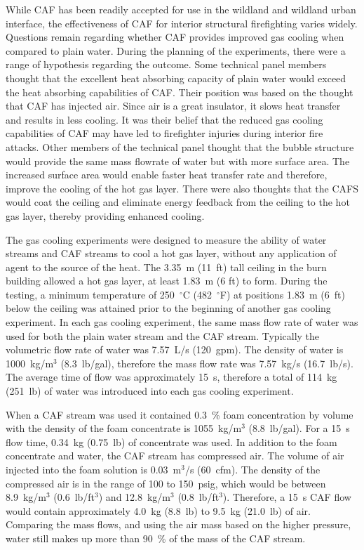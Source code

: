 \documentclass[12pt,oneside]{book}
\begin{document}
While CAF has been readily accepted for use in the wildland and wildland urban interface, the effectiveness of CAF for interior structural firefighting varies widely. Questions remain regarding whether CAF provides improved gas cooling when compared to plain water. During the planning of the experiments, there were a range of hypothesis regarding the outcome. Some technical panel members thought that the excellent heat absorbing capacity of plain water would exceed the heat absorbing capabilities of CAF. Their position was based on the thought that CAF has injected air. Since air is a great insulator, it slows heat transfer and results in less cooling. It was their belief that the reduced gas cooling capabilities of CAF may have led to firefighter injuries during interior fire attacks. Other members of the technical panel thought that the bubble structure would provide the same mass flowrate of water but with more surface area. The increased surface area would enable faster heat transfer rate and therefore, improve the cooling of the hot gas layer. There were also thoughts that the CAFS would coat the ceiling and eliminate energy feedback from the ceiling to the hot gas layer, thereby providing enhanced cooling.

The gas cooling experiments were designed to measure the ability of water streams and CAF streams to cool a hot gas layer, without any application of agent to the source of the heat. The 3.35~m (11~ft) tall ceiling in the burn building allowed a hot gas layer, at least 1.83~m (6 ft) to form. During the testing, a minimum temperature of 250~$^{\circ}$C (482~$^{\circ}$F) at positions 1.83~m (6~ft) below the ceiling was attained prior to the beginning of another gas cooling experiment. In each gas cooling experiment, the same mass flow rate of water was used for both the plain water stream and the CAF stream. Typically the volumetric flow rate of water was 7.57~L/s (120~gpm). The density of water is 1000~kg/m$^3$ (8.3~lb/gal), therefore the mass flow rate was 7.57~kg/s (16.7~lb/s). The average time of flow was approximately 15~s, therefore a total of 114~kg (251~lb) of water was introduced into each gas cooling experiment.

When a CAF stream was used it contained 0.3~\% foam concentration by volume with the density of the foam concentrate is 1055~kg/m$^3$ (8.8~lb/gal). For a 15~s flow time, 0.34~kg (0.75~lb) of concentrate was used. In addition to the foam concentrate and water, the CAF stream has compressed air. The volume of air injected into the foam solution is 0.03~m$^3$/s (60~cfm). The density of the compressed air is in the range of 100 to 150~psig, which would be between 8.9~kg/m$^3$ (0.6~lb/ft$^3$) and 12.8~kg/m$^3$ (0.8~lb/ft$^3$). Therefore, a 15~s CAF flow would contain approximately 4.0~kg (8.8~lb) to 9.5~kg (21.0~lb) of air. Comparing the mass flows, and using the air mass based on the higher pressure, water still makes up more than 90~\% of the mass of the CAF stream.  
\end{document}
